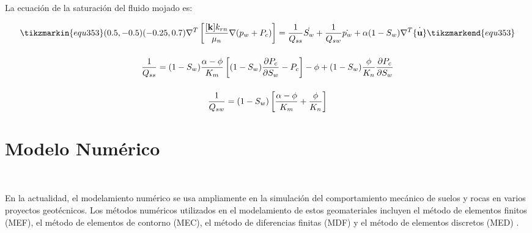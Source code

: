 
La ecuación de la saturación del fluido mojado es:\bigskip

\begin{ceqn} 
\begin{subequations} \label{eq:equ353} 
\begin{gather}
\tikzmarkin{equ353}(0.5,-0.5)(-0.25,0.7)
\nabla^T \left[\frac{[\mathbf{k}] k_{rn}}{\mu_{n}}\nabla (p_w + P_c)\right] = 
\frac{1}{Q_{ss}} \dot{S_w} + \frac{1}{Q_{sw}} \dot{p_w} +\alpha (1-S_w) \nabla^T \dot{\{\mathbf{u}\}} 
\tikzmarkend{equ353}\label{eq:equ353a} \\[12pt]
\frac{1}{Q_{ss}} = (1-S_w) \frac{\alpha - \phi}{K_m} \left[(1-S_w) \frac{\partial P_c}{\partial S_w} - P_c\right] - \phi +  (1-S_w)\frac{\phi}{K_n}\frac{\partial P_c}{\partial S_w} \label{eq:equ353b} \\[12pt]
\frac{1}{Q_{sw}} = (1-S_w) \left[ \frac{\alpha - \phi}{K_m} + \frac{\phi}{K_n} \right]  \label{eq:equ353c}
\end{gather}  
\end{subequations} 
\end{ceqn}


\newpage

\section{Modelo Numérico}~\hypertarget{sec:sec340}{}
\label{sec:sec340}

En la actualidad, el modelamiento numérico se usa ampliamente en la simulación del comportamiento mecánico de suelos y rocas en varios proyectos geotécnicos. Los métodos numéricos utilizados en el modelamiento de estos geomateriales incluyen el método de elementos finitos (MEF), el método de elementos de contorno (MEC), el método de diferencias finitas (MDF) y el método de elementos discretos (MED) \cite{Li2018RockboltingApplications}.\bigskip 

